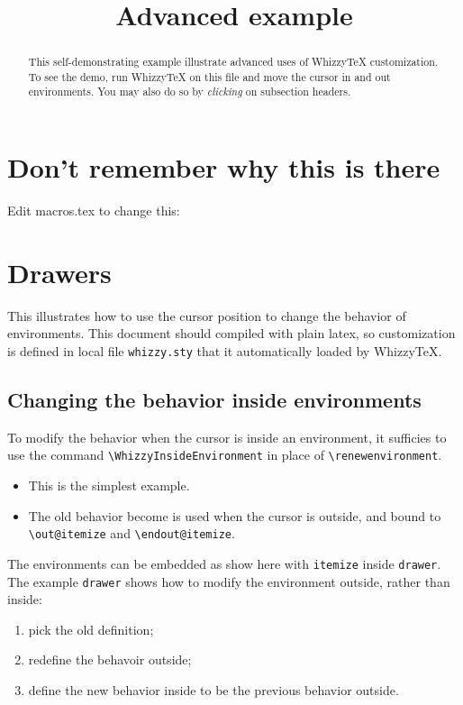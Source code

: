 \documentclass{article}
\title {Advanced example}
\newenvironment{drawer}[1]{\subsection{#1}}{}
\begin{document}
\maketitle
\begin{abstract}
This self-demonstrating example illustrate advanced uses of {WhizzyTeX}
customization. To see the demo, run WhizzyTeX on this file and move the
cursor in and out environments. You may also do so by \emph{clicking}
on subsection headers.
\end{abstract}

\section{Don't remember why this is there}
Edit macros.tex to change this: \macroreloaded

\section{Drawers}
This illustrates how to use the cursor position to change the behavior of
environments. This document should compiled with plain latex, so
customization is defined in local file \verb"whizzy.sty" that it
automatically loaded by WhizzyTeX.

\begin{drawer}{Changing the behavior inside environments}
To modify the behavior when the cursor is inside an environment, it
sufficies to use the command \verb"\WhizzyInsideEnvironment" 
in place of \verb"\renewenvironment". 
\begin{itemize}
\item This is the simplest example. 
\item The old behavior become is used when the cursor is outside, and bound
to \verb"\out@itemize" and \verb"\endout@itemize". 
\end{itemize}
The environments can be embedded as show here with \verb"itemize" inside
\verb"drawer". 
The example \verb"drawer" shows how to modify the environment outside,
rather than inside: 
\begin{enumerate}
\item pick the old definition;
\item redefine the behavoir outside;
\item define the new behavior inside to be the previous behavior outside.
\end{enumerate}
\end{drawer}
\end{document}
